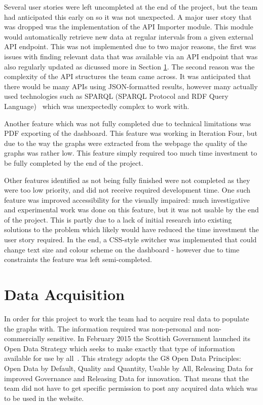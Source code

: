 \documentclass{l3proj}
\begin{document}
Several user stories were left uncompleted at the end of the project, but the team had anticipated this early on so it was not unexpected. A major user story that was dropped was the implementation of the API Importer module. This module would automatically retrieve new data at regular intervals from a given external API endpoint. This was not implemented due to two major reasons, the first was issues with finding relevant data that was available via an API endpoint that was also regularly updated as dicussed more in Section \ref{sec:data-acquisition}. The second reason was the complexity of the API structures the team came across. It was anticipated that there would be many APIs using JSON-formatted results, however many actually used technologies such as SPARQL (SPARQL Protocol and RDF Query Language)~\cite{W3SPARQL} which was unexpectedly complex to work with.

Another feature which was not fully completed due to technical limitations was PDF exporting of the dashboard. This feature was working in Iteration Four, but due to the way the graphs were extracted from the webpage the quality of the graphs was rather low. This feature simply required too much time investment to be fully completed by the end of the project.

Other features identified as not being fully finished were not completed as they were too low priority, and did not receive required development time. One such feature was improved accessibility for the visually impaired: much investigative and experimental work was done on this feature, but it was not usable by the end of the project. This is partly due to a lack of initial research into existing solutions to the problem which likely would have reduced the time investment the user story required. In the end, a CSS-style switcher was implemented that could change text size and colour scheme on the dashboard - however due to time constraints the feature was left semi-completed.



\section{Data Acquisition}
\label{sec:data-acquisition}

In order for this project to work the team had to acquire real data to populate the graphs with. The information required was non-personal and non-commercially sensitive. In February 2015 the Scottish Government launched its Open Data Strategy which seeks to make exactly that type of information available for use by all~\cite{ScotGovOpenDataResourcePack}. This strategy adopts the G8 Open Data Principles: Open Data by Default, Quality and Quantity, Usable by All, Releasing Data for improved Governance and Releasing Data for innovation. That means that the team did not have to get specific permission to post any acquired data which was to be used in the website.
\end{document}

